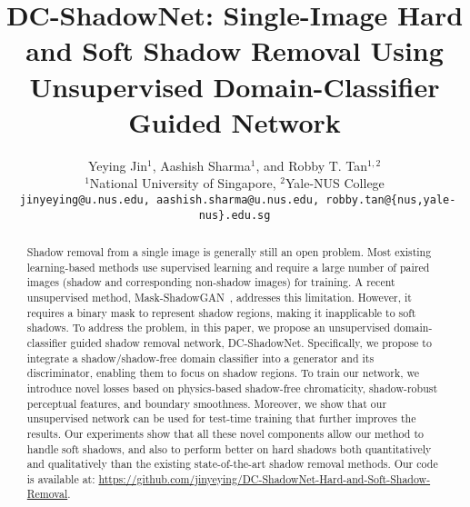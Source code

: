 \documentclass[10pt,twocolumn,letterpaper]{article}
\begin{document}
	
\title{DC-ShadowNet: Single-Image Hard and Soft Shadow Removal Using  \\
	Unsupervised Domain-Classifier Guided Network}

\author{Yeying Jin$^{1}$, Aashish Sharma$^{1}$, and Robby T. Tan$^{1,2}$\\
	$^1$National University of Singapore, $^2$Yale-NUS College\\
	{\tt\small 
		jinyeying@u.nus.edu, aashish.sharma@u.nus.edu, robby.tan@\{nus,yale-nus\}.edu.sg}
	}
\maketitle
\thispagestyle{empty}
\def\thefootnote{$\dagger$}\def\thefootnote{\arabic{footnote}}

\maketitle
\ificcvfinal\thispagestyle{empty}\fi

\begin{abstract}
Shadow removal from a single image is generally still an open problem. Most existing learning-based methods use supervised learning and require a large number of paired images (shadow and corresponding non-shadow images) for training. A recent unsupervised method, Mask-ShadowGAN~\cite{Hu19}, addresses this limitation. However, it requires a binary mask to represent shadow regions, making it inapplicable to soft shadows. To address the problem, in this paper, we propose an unsupervised domain-classifier guided shadow removal network, DC-ShadowNet. Specifically, we propose to integrate a shadow/shadow-free domain classifier into a generator and its discriminator, enabling them to focus on shadow regions. To train our network, we introduce novel losses based on physics-based shadow-free chromaticity, shadow-robust perceptual features, and boundary smoothness. Moreover, we show that our unsupervised network can be used for test-time training that further improves the results. Our experiments show that all these novel components allow our method to handle soft shadows, and also to perform better on hard shadows both quantitatively and qualitatively than the existing state-of-the-art shadow removal methods.
Our code is available at: \url{https://github.com/jinyeying/DC-ShadowNet-Hard-and-Soft-Shadow-Removal}.
\end{abstract}
\end{document}
